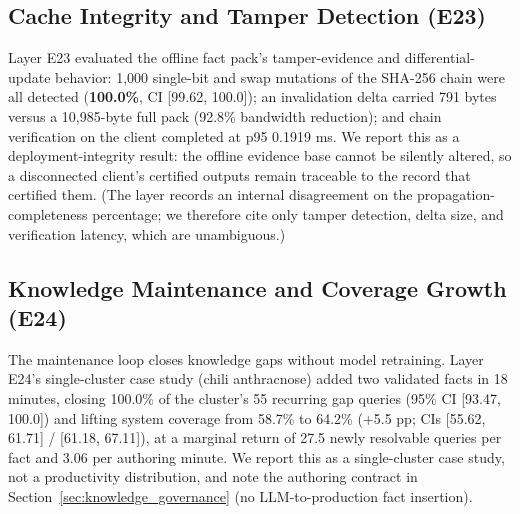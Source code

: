 \subsection{Cache Integrity and Tamper Detection (E23)}
Layer E23 evaluated the offline fact pack's tamper-evidence and differential-update behavior: 1{,}000 single-bit and swap mutations of the SHA-256 chain were all detected (\textbf{100.0\%}, CI [99.62, 100.0]); an invalidation delta carried 791 bytes versus a 10{,}985-byte full pack (92.8\% bandwidth reduction); and chain verification on the client completed at p95 0.1919 ms. We report this as a deployment-integrity result: the offline evidence base cannot be silently altered, so a disconnected client's certified outputs remain traceable to the record that certified them. (The layer records an internal disagreement on the propagation-completeness percentage; we therefore cite only tamper detection, delta size, and verification latency, which are unambiguous.)

\subsection{Knowledge Maintenance and Coverage Growth (E24)}
The maintenance loop closes knowledge gaps without model retraining. Layer E24's single-cluster case study (chili anthracnose) added two validated facts in 18 minutes, closing 100.0\% of the cluster's 55 recurring gap queries (95\% CI [93.47, 100.0]) and lifting system coverage from 58.7\% to 64.2\% (+5.5 pp; CIs [55.62, 61.71] / [61.18, 67.11]), at a marginal return of 27.5 newly resolvable queries per fact and 3.06 per authoring minute. We report this as a single-cluster case study, not a productivity distribution, and note the authoring contract in Section~\ref{sec:knowledge_governance} (no LLM-to-production fact insertion).